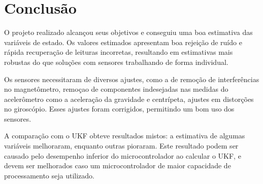 \documentclass[
	12pt,				%
	openright,			%
	twoside,			%
	convert,
	a4paper,			%
	english,			%
	french,				%
	spanish,			%
	brazil				%
	]{abntex2}
\begin{document}
\section{Conclusão}
\par

O projeto realizado alcançou seus objetivos e conseguiu uma boa estimativa das variáveis de estado. Os valores estimados apresentam boa rejeição de ruído e rápida recuperação de leituras incorretas, resultando em estimativas mais robustas do que soluções com sensores trabalhando de forma individual.
\par
Os sensores necessitaram de diversos ajustes, como a de remoção de interferências no magnetômetro, remoçao de componentes indesejadas nas medidas do acelerômetro como a aceleração da gravidade e centrípeta, ajustes em distorções no giroscópio. Esses ajustes foram corrigidos, permitindo um bom uso dos sensores.
\par
A comparação com o UKF obteve resultados mistos: a estimativa de algumas variáveis melhoraram, enquanto outras pioraram. Este resultado podem ser causado pelo desempenho inferior do microcontrolador ao calcular o UKF, e devem ser melhorados caso um microcontrolador de maior capacidade de processamento seja utilizado.
\par


\postextual



%
%

\printindex
\end{document}
